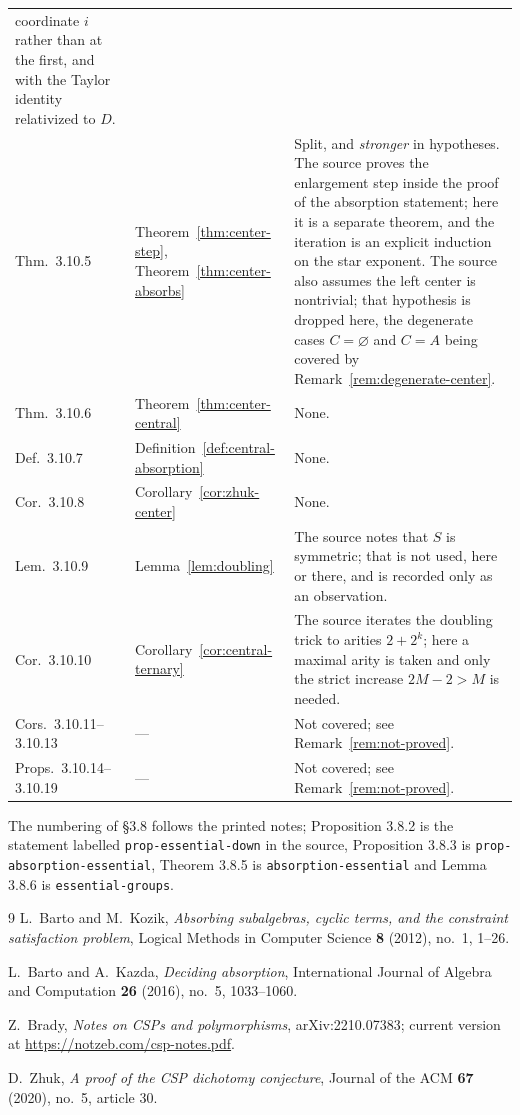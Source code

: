\documentclass[11pt]{article}
\theoremstyle{mainplain}
\theoremstyle{mainroman}
\theoremstyle{definition}
\numberwithin{equation}{section}
\begin{document}
\begin{longtable}{@{}>{\raggedright\arraybackslash}p{}>{\raggedright\arraybackslash}p{}>{\raggedright\arraybackslash}p{}@{}}
coordinate $i$ rather than at the first, and with the Taylor identity
relativized to $D$.\\
Thm.\ 3.10.5 & Theorem~\ref{thm:center-step}, Theorem~\ref{thm:center-absorbs}
& Split, and \emph{stronger} in hypotheses. The source proves the enlargement
step inside the proof of the absorption statement; here it is a separate
theorem, and the iteration is an explicit induction on the star exponent. The
source also assumes the left center is nontrivial; that hypothesis is dropped
here, the degenerate cases $C=\varnothing$ and $C=A$ being covered by
Remark~\ref{rem:degenerate-center}.\\
Thm.\ 3.10.6 & Theorem~\ref{thm:center-central} & None.\\
Def.\ 3.10.7 & Definition~\ref{def:central-absorption} & None.\\
Cor.\ 3.10.8 & Corollary~\ref{cor:zhuk-center} & None.\\
Lem.\ 3.10.9 & Lemma~\ref{lem:doubling} & The source notes that $S$ is
symmetric; that is not used, here or there, and is recorded only as an
observation.\\
Cor.\ 3.10.10 & Corollary~\ref{cor:central-ternary} & The source iterates the
doubling trick to arities $2+2^{k}$; here a maximal arity is taken and only the
strict increase $2M-2>M$ is needed.\\
Cors.\ 3.10.11--3.10.13 & --- & Not covered; see Remark~\ref{rem:not-proved}.\\
Props.\ 3.10.14--3.10.19 & --- & Not covered; see Remark~\ref{rem:not-proved}.\\
\end{longtable}

The numbering of \S3.8 follows the printed notes; Proposition 3.8.2 is the
statement labelled \texttt{prop-essential-down} in the source, Proposition 3.8.3
is \texttt{prop-absorption-essential}, Theorem 3.8.5 is
\texttt{absorption-essential} and Lemma 3.8.6 is \texttt{essential-groups}.

\begin{thebibliography}{9}
L.~Barto and M.~Kozik,
\emph{Absorbing subalgebras, cyclic terms, and the constraint satisfaction problem},
Logical Methods in Computer Science \textbf{8} (2012), no.~1, 1--26.

L.~Barto and A.~Kazda,
\emph{Deciding absorption},
International Journal of Algebra and Computation \textbf{26} (2016), no.~5,
1033--1060.

Z.~Brady,
\emph{Notes on CSPs and polymorphisms},
arXiv:2210.07383; current version at \url{https://notzeb.com/csp-notes.pdf}.

D.~Zhuk,
\emph{A proof of the CSP dichotomy conjecture},
Journal of the ACM \textbf{67} (2020), no.~5, article 30.
\end{thebibliography}
\end{document}
